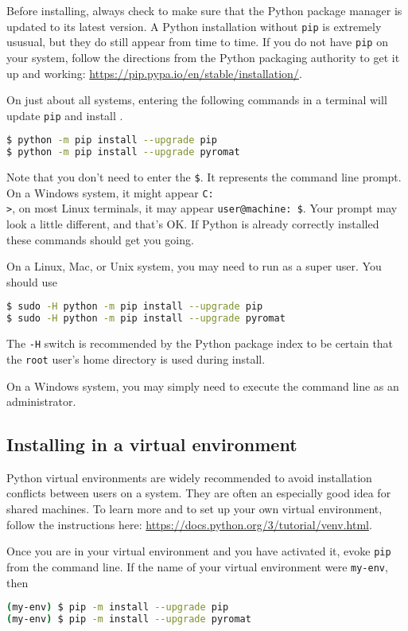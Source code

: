 Before installing, always check to make sure that the Python package manager is updated to its latest version.  A Python installation without \texttt{pip} is extremely ususual, but they do still appear from time to time.  If you do not have \texttt{pip} on your system, follow the directions from the Python packaging authority to get it up and working: \url{https://pip.pypa.io/en/stable/installation/}.

On just about all systems, entering the following commands in a terminal will update \texttt{pip} and install \PM.
\begin{lstlisting}[language=bash]
$ python -m pip install --upgrade pip
$ python -m pip install --upgrade pyromat
\end{lstlisting}
Note that you don't need to enter the \texttt{\$}.  It represents the command line prompt. On a Windows system, it might appear \texttt{C:\\>}, on most Linux terminals, it may appear \texttt{user@machine:~\$}.  Your prompt may look a little different, and that's OK.  If Python is already correctly installed these commands should get you going.

On a Linux, Mac, or Unix system, you may need to run as a super user.  You should use
\begin{lstlisting}[language=bash]
$ sudo -H python -m pip install --upgrade pip
$ sudo -H python -m pip install --upgrade pyromat
\end{lstlisting}
The \texttt{-H} switch is recommended by the Python package index to be certain that the \texttt{root} user's home directory is used during install.

On a Windows system, you may simply need to execute the command line as an administrator.  

\subsection{Installing in a virtual environment}

Python virtual environments are widely recommended to avoid installation conflicts between users on a system.  They are often an especially good idea for shared machines.  To learn more and to set up your own virtual environment, follow the instructions here: \url{https://docs.python.org/3/tutorial/venv.html}.  

Once you are in your virtual environment and you have activated it, evoke \texttt{pip} from the command line.  If the name of your virtual environment were \texttt{my-env}, then
\begin{lstlisting}[language=bash]
(my-env) $ pip -m install --upgrade pip
(my-env) $ pip -m install --upgrade pyromat
\end{lstlisting}


